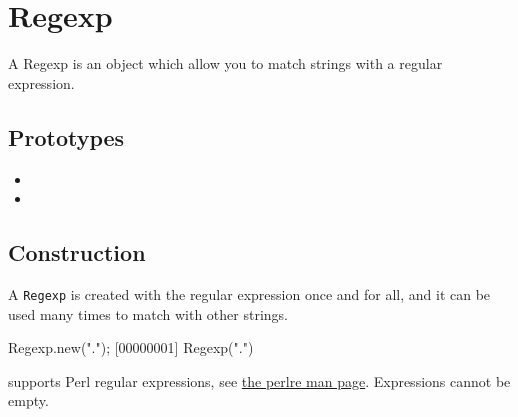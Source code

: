 
\section{Regexp}

A Regexp is an object which allow you to match strings with a regular
expression.

\subsection{Prototypes}
\begin{itemize}
\item {}
\item {}
\end{itemize}

\subsection{Construction}
\label{stdlib:regexp:ctor}

A \lstinline{Regexp} is created with the regular expression once and
for all, and it can be used many times to match with other strings.

\begin{urbiscript}[firstnumber=1]
Regexp.new(".");
[00000001] Regexp(".")
\end{urbiscript}

\us supports Perl regular expressions, see
\href{http://perldoc.perl.org/perlre.html}{the perlre man page}.
Expressions cannot be empty.


